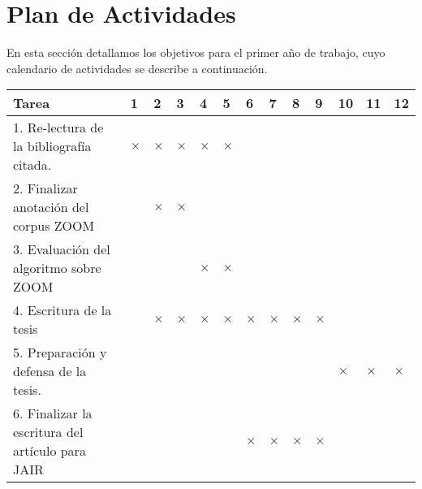 \section{Plan de Actividades}
\label{plandetrabajo}

En esta secci\'on detallamos los objetivos para el primer a\~no de trabajo, cuyo calendario de actividades se describe a continuaci\'on. 

{\footnotesize
\begin{center}
\begin{tabular}{|p{7cm}||p{2mm}|p{2mm}|p{2mm}|p{2mm}||p{2mm}|p{2mm}|p{2mm}|p{2mm
}||p{2mm}|p{2mm}|p{2mm}|p{2mm}|}
\hline
 \rowcolor[rgb]{0.8,0.8,0.8}\hspace{3.5cm}Tarea & 1 & 2 & 3 & 4 & 5 & 6 & 7 & 8
& 9 & 10 & 11 & 12\\
\hline 1. Re-lectura de la bibliograf\'ia citada. & $\times$ & $\times$ & $\times$ & $\times$ & $\times$ &&&&&&&\\
\hline 2. Finalizar anotaci\'on del corpus ZOOM &  & $\times$ & $\times$ &  && &&&&&&\\
\hline 3. Evaluaci\'on del algoritmo sobre ZOOM &  &          &          & $\times$ & $\times$ & &&&&&&\\
\hline 4. Escritura de la tesis & &$\times$&$\times$& $\times$ & $\times$ & $\times$ & $\times$ & $\times$ & $\times$ &&&\\
\hline 5. Preparaci\'on y defensa de la tesis. & & &  &&&&&&&$\times$&$\times$&$\times$\\
\hline 6. Finalizar la escritura del art\'iculo para JAIR && &  &&&$\times$&$\times$&$\times$&$\times$&&&\\
\hline
\end{tabular}\end{center}
}


